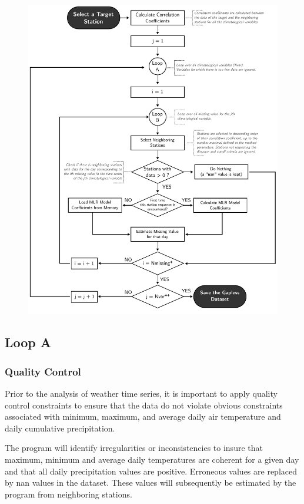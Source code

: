 \documentclass[ARTICLETHERMIC.tex]{subfiles}
\begin{document}
\begin{figure}[!p]
    \centering
    \includegraphics[width=\textwidth]{img/Flowchart-filling_missing_weather.pdf} 
    \caption{}
    \label{fig:fillworker_flowchart}
\end{figure}

\subsection{Loop A}

\subsubsection{Quality Control}

Prior to the analysis of weather time series, it is important to apply quality control constraints to ensure that the data do not violate obvious constraints associated with minimum, maximum, and average daily air temperature and daily cumulative precipitation. 

The program will identify irregularities or inconsistencies to insure that maximum, minimum and average daily temperatures are coherent for a given day and that all daily precipitation values are positive. Erroneous values are replaced by nan values in the dataset. These values will subsequently be estimated by the program from neighboring stations.
\end{document}

